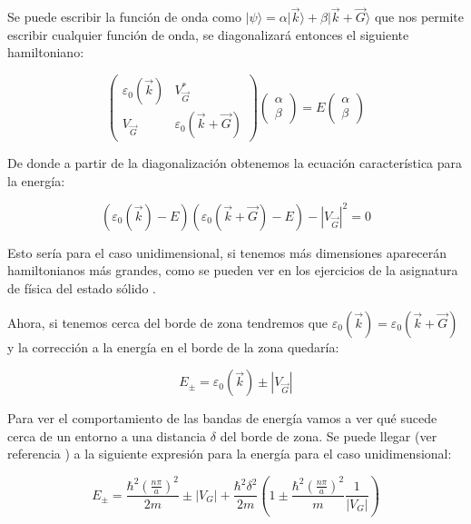 \documentclass{article} %
\begin{document}
Se puede escribir la función de onda como $|\psi\rangle = \alpha |\vec{k}\rangle + \beta |\vec{k}+\vec{G}\rangle$ que nos permite escribir cualquier función de onda, se diagonalizará entonces el siguiente hamiltoniano:

\begin{equation}
\left( \begin{array}{cc}
\varepsilon_0(\vec{k}) & V_{\vec{G}}^* \\
V_{\vec{G}} & \varepsilon_0(\vec{k}+\vec{G})
\end{array} \right) \left( \begin{array}{c}
\alpha \\
\beta
\end{array} \right) = E \left( \begin{array}{c}
\alpha \\
\beta
\end{array} \right)
\end{equation}

De donde a partir de la diagonalización obtenemos la ecuación característica para la energía:

\begin{equation}
\left( \varepsilon_0(\vec{k}) - E \right)\left(\varepsilon_0(\vec{k}+\vec{G})-E\right) - |V_{\vec{G}}|^2 = 0
\end{equation}

Esto sería para el caso unidimensional, si tenemos más dimensiones aparecerán hamiltonianos más grandes, como se pueden ver en los ejercicios de la asignatura de física del estado sólido \cite{apuntes}.

Ahora, si tenemos cerca del borde de zona tendremos que $\varepsilon_0(\vec{k}) = \varepsilon_0(\vec{k}+\vec{G})$ y la corrección a la energía en el borde de la zona quedaría:

\begin{equation}
E_{\pm} = \varepsilon_0(\vec{k}) \pm |V_{\vec{G}}|
\end{equation}

Para ver el comportamiento de las bandas de energía vamos a ver qué sucede cerca de un entorno a una distancia $\delta$ del borde de zona. Se puede llegar (ver referencia \cite{simon2013oxford}) a la siguiente expresión para la energía para el caso unidimensional:

\begin{equation}
E_{\pm} = \frac{\hbar^2\left(\frac{n\pi}{a}\right)^2}{2m} \pm |V_G| + \frac{\hbar^2 \delta^2}{2m}\left(1\pm\frac{\hbar^2\left(\frac{n\pi}{a}\right)^2}{m}\frac{1}{|V_G|}\right)
\end{equation}
\end{document}
